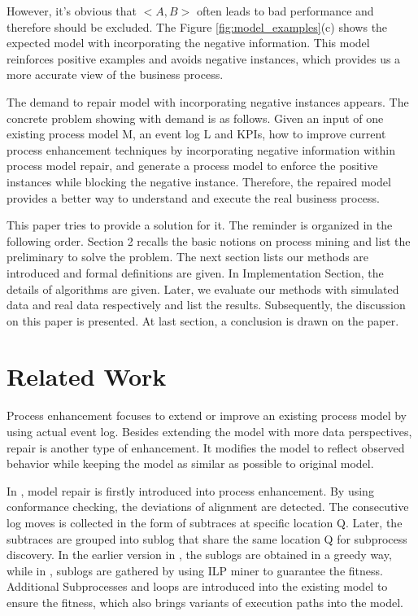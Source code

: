 \documentclass[]{article}
\begin{document}
However, it's obvious that $<A,B>$ often leads to bad performance and therefore should be excluded. The Figure \ref{fig:model_examples}(c) shows the expected model with incorporating the negative information. This model reinforces positive examples and avoids negative instances, which provides us a more accurate view of the business process.

The demand to repair model with incorporating negative instances appears. The concrete problem showing with demand is as follows. Given an input of one existing process model M, an event log L and KPIs, how  to improve current process enhancement techniques by incorporating negative information within process model repair, and generate a process model to enforce the positive instances while blocking the negative instance. Therefore, the repaired model provides a better way to understand and execute the real business process.


This paper tries to provide a solution for it. The reminder is organized in the following order. Section 2 recalls the basic notions on process mining and list the preliminary to solve the problem. The next section lists our methods are introduced and formal definitions are given. In Implementation Section, the details of algorithms are given. Later, we evaluate our methods with simulated data and real data respectively and list the results. Subsequently, the discussion on this paper is presented. At last section, a conclusion is drawn on the paper. 

\section{Related Work}

Process enhancement focuses to extend or improve an existing process model by using actual event log\cite{van2011process}. Besides extending the model with more data perspectives, repair is another type of enhancement. It modifies the model to reflect observed behavior while keeping the model as similar as possible to original model.

In \cite{fahland2012repairing}, model repair is firstly introduced into process enhancement. By using conformance checking, the deviations of alignment are detected. The consecutive log moves is collected in the form of subtraces at specific location Q. Later, the subtraces are grouped into sublog that share the same location Q for subprocess discovery. In the earlier version in \cite{fahland2012repairing}, the sublogs are obtained in a greedy way, while in \cite{fahland2015model}, sublogs are gathered by using ILP miner to guarantee the fitness. Additional Subprocesses and loops are introduced into the existing model to ensure the fitness, which also brings variants of execution paths into the model. 
\end{document}
